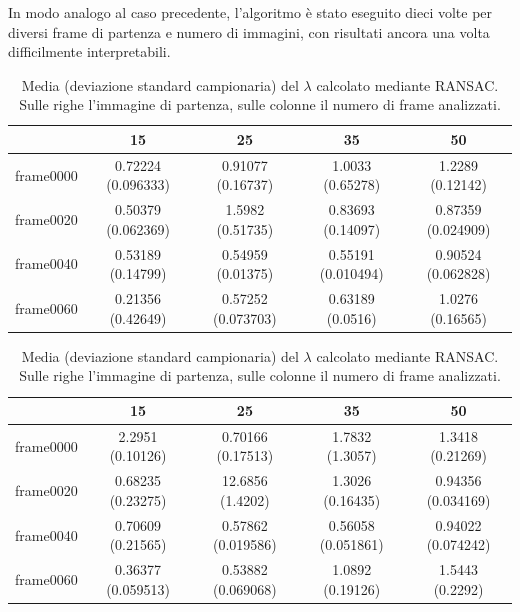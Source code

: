 \documentclass[12pt]{report}
\begin{document}
\noindent In modo analogo al caso precedente, l'algoritmo \`e stato eseguito dieci volte per diversi frame di partenza e numero di immagini, con risultati ancora una volta difficilmente interpretabili.

\begin{table}[H]
\begin{center}
\begin{tabular}{|c|c|c|c|c|}
	\hline
	& 15 & 25 & 35 & 50 \\ \hline
	frame0000 & 0.72224 (0.096333) & 0.91077 (0.16737) & 1.0033 (0.65278) & 1.2289 (0.12142)\\ \hline
	frame0020 & 0.50379 (0.062369) & 1.5982 (0.51735) & 0.83693 (0.14097) & 0.87359 (0.024909)\\ \hline
	frame0040 & 0.53189 (0.14799) & 0.54959 (0.01375) & 0.55191 (0.010494) & 0.90524 (0.062828)\\ \hline
	frame0060 & 0.21356 (0.42649) & 0.57252 (0.073703) & 0.63189 (0.0516) & 1.0276 (0.16565)\\ \hline
\end{tabular}
\caption{Media (deviazione standard campionaria) del $\lambda$ calcolato mediante RANSAC. Sulle righe l'immagine di partenza, sulle colonne il numero di frame analizzati.}
\label{tabRans}
\end{center}
\end{table}

\begin{table}[H]
\begin{center}
\begin{tabular}{|c|c|c|c|c|}
	\hline
	& 15 & 25 & 35 & 50 \\ \hline
	frame0000 & 2.2951 (0.10126) & 0.70166 (0.17513) & 1.7832 (1.3057) & 1.3418 (0.21269)\\ \hline
	frame0020 & 0.68235 (0.23275) & 12.6856 (1.4202) & 1.3026 (0.16435) & 0.94356 (0.034169)\\ \hline
	frame0040 & 0.70609 (0.21565) & 0.57862 (0.019586) & 0.56058 (0.051861) & 0.94022 (0.074242)\\ \hline
	frame0060 & 0.36377 (0.059513) & 0.53882 (0.069068) & 1.0892 (0.19126) & 1.5443 (0.2292)\\ \hline
\end{tabular}
\caption{Media (deviazione standard campionaria) del $\lambda$ calcolato mediante RANSAC. Sulle righe l'immagine di partenza, sulle colonne il numero di frame analizzati.}
\label{tabRans2}
\end{center}
\end{table}
\end{document}
